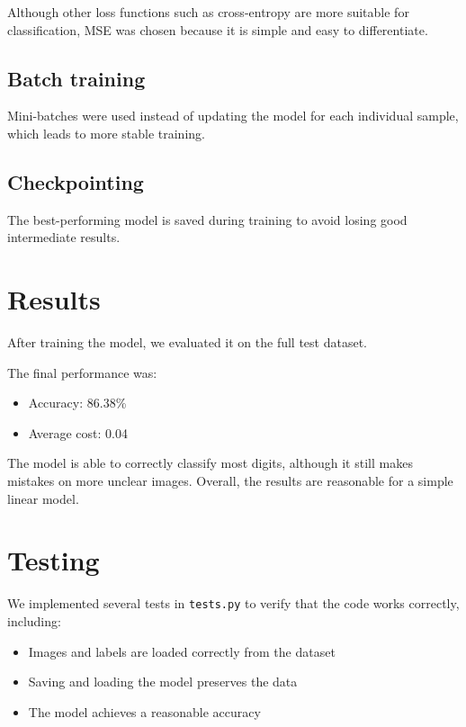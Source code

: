 \documentclass[a4paper, 11pt]{report}
\begin{document}
Although other loss functions such as cross-entropy are more suitable for classification, MSE was chosen because it is simple and easy to differentiate.
    
\subsection*{Batch training}
Mini-batches were used instead of updating the model for each individual sample, which leads to more stable training.
    
\subsection*{Checkpointing} 
The best-performing model is saved during training to avoid losing good intermediate results.


\vspace{20pt}
\section*{Results}

After training the model, we evaluated it on the full test dataset.

The final performance was:
\begin{itemize}
    \item Accuracy: 86.38\%
    \item Average cost: 0.04
\end{itemize}

The model is able to correctly classify most digits, although it still makes mistakes on more unclear images. Overall, the results are reasonable for a simple linear model.

\vspace{20pt}
\section*{Testing}

We implemented several tests in \texttt{tests.py} to verify that the code works correctly, including:

\begin{itemize}
    \item Images and labels are loaded correctly from the dataset
    \item Saving and loading the model preserves the data
    \item The model achieves a reasonable accuracy
\end{itemize}
\end{document}
